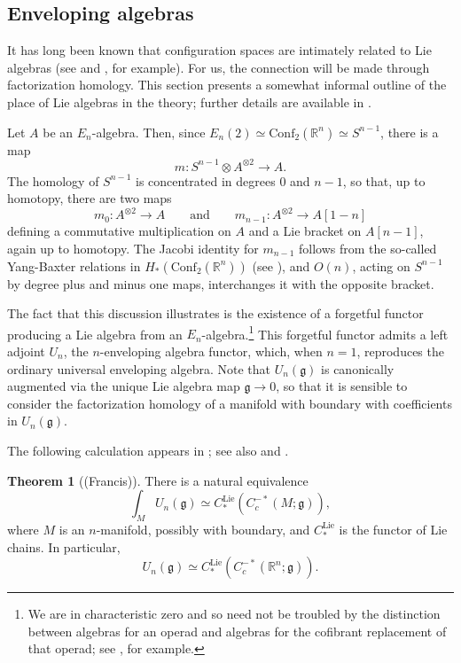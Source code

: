 \documentclass{compositio}
\theoremstyle{definition}\newtheorem{definition}{Definition}[section]
\theoremstyle{theorem}\newtheorem{lemma}[definition]{Lemma}
\theoremstyle{remark}\newtheorem*{conventions}{Conventions}
\theoremstyle{remark}\newtheorem*{acknowledgments}{Acknowledgments}
\theoremstyle{remark}\newtheorem*{outline}{Outline}
\theoremstyle{remark}\newtheorem*{questions}{Questions}
\theoremstyle{remark}\newtheorem{example}[definition]{Example}
\theoremstyle{definition}\newtheorem{construction}[definition]{Construction}
\theoremstyle{definition}\newtheorem*{convention}{Convention}
\theoremstyle{definition}\newtheorem*{conjecture}{Conjecture}
\theoremstyle{theorem}\newtheorem{theorem}[definition]{Theorem}
\theoremstyle{theorem}\newtheorem{paradigm}[definition]{Paradigm}
\theoremstyle{remark}\newtheorem{remark}[definition]{Remark}
\theoremstyle{corollary}\newtheorem{corollary}[definition]{Corollary}
\theoremstyle{theorem}\newtheorem{proposition}[definition]{Proposition}
\theoremstyle{definition}\newtheorem{question}[definition]{Question}
\begin{document}
\subsection{Enveloping algebras}\label{Lie algebras}

It has long been known that configuration spaces are intimately related to Lie algebras (see \cite{Cohen} and \cite{CohenTaylor}, for example). For us, the connection will be made through factorization homology. This section presents a somewhat informal outline of the place of Lie algebras in the theory; further details are available in \cite{Francis}.

Let $A$ be an $E_n$-algebra. Then, since $E_n(2)\simeq {\mathrm{Conf}}_2(\mathbb{R}^n)\simeq S^{n-1}$, there is a map $$m: S^{n-1}\otimes A^{\otimes 2}\to A.$$ The homology of $S^{n-1}$ is concentrated in degrees 0 and $n-1$, so that, up to homotopy, there are two maps $$m_0:A^{\otimes2}\to A\qquad\text{and}\qquad m_{n-1}: A^{\otimes 2}\to A[1-n]$$ defining a commutative multiplication on $A$ and a Lie bracket on $A[n-1]$, again up to homotopy. The Jacobi identity for $m_{n-1}$ follows from the so-called Yang-Baxter relations in $H_*({\mathrm{Conf}}_2(\mathbb{R}^n))$ (see \cite{FH}), and $O(n)$, acting on $S^{n-1}$ by degree plus and minus one maps, interchanges it with the opposite bracket.

The fact that this discussion illustrates is the existence of a forgetful functor producing a Lie algebra from an  $E_n$-algebra.\footnote{We are in characteristic zero and so need not be troubled by the distinction between algebras for an operad and algebras for the cofibrant replacement of that operad; see \cite{MayOperads}, for example.} This forgetful functor admits a left adjoint $U_n$, the $n$-enveloping algebra functor, which, when $n=1$, reproduces the ordinary universal enveloping algebra. Note that $U_n(\mathfrak{g})$ is canonically augmented via the unique Lie algebra map $\mathfrak{g}\to0$, so that it is sensible to consider the factorization homology of a manifold with boundary with coefficients in $U_n(\mathfrak{g})$.

The following calculation appears in \cite{Francis}; see also \cite{FG} and \cite{Gwilliam}.

\begin{theorem}[(Francis)]\label{enveloping calculation}
There is a natural equivalence $$\int_M U_n(\mathfrak{g})\simeq C_*^{\mathrm{Lie}}(C_c^{-*}(M;\mathfrak{g})),$$ where $M$ is an $n$-manifold, possibly with boundary, and $C_*^{\mathrm{Lie}}$ is the functor of Lie chains. In particular, $$U_n(\mathfrak{g})\simeq C_*^{\mathrm{Lie}}( C_c^{-*}(\mathbb{R}^n;\mathfrak{g})).$$
\end{theorem}
\end{document}
